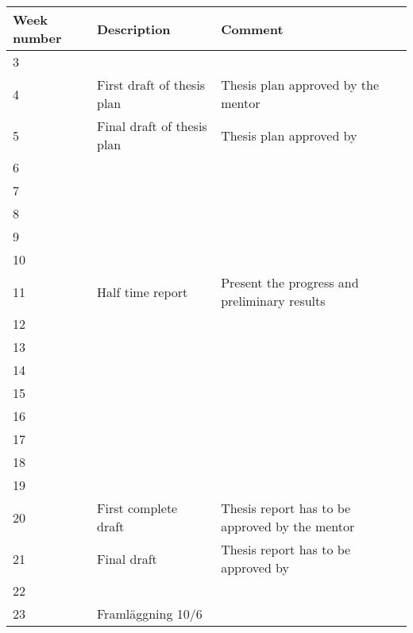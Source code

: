 

\begin{tabular}{l|l|l}
	\hline
	Week number & Description                & Comment                                        \\ \hline
	3           &                            &  \\ \hline
	4           & First draft of thesis plan & Thesis plan approved by the mentor             \\ \hline
	5           & Final draft of thesis plan & Thesis plan approved by                        \\ \hline
	6           &                            &  \\ \hline
	7           &                            &  \\ \hline
	8           &                            &  \\ \hline
	9           &                            &  \\ \hline
	10          &                            &  \\ \hline
	11          & Half time report           & Present the progress and preliminary results   \\ \hline
	12          &                            &  \\ \hline
	13          &                            &  \\ \hline
	14          &                            &  \\ \hline
	15          &                            &  \\ \hline
	16          &                            &  \\ \hline
	17          &                            &  \\ \hline
	18          &                            &  \\ \hline
	19          &                            &  \\ \hline
	20          & First complete draft       & Thesis report has to be approved by the mentor \\ \hline
	21          & Final draft                & Thesis report has to be approved by            \\ \hline
	22          &                            &  \\ \hline
	23          & Framläggning 10/6          &  \\ \hline
\end{tabular}